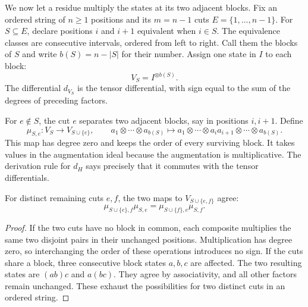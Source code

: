 We now let a residue multiply the states at its two adjacent blocks.
Fix an ordered string of $n\geq1$ positions and its $m=n-1$ cuts
$E=\{1,\ldots,n-1\}$.
For $S\subseteq E$, declare positions $i$ and $i+1$ equivalent when $i\in S$.
The equivalence classes are consecutive intervals, ordered from left to right.
Call them the blocks of $S$ and write $b(S)=n-|S|$ for their number.
Assign one state in $I$ to each block:
\begin{equation}
\label{eq:interval-coefficient-system}
V_S=I^{\otimes b(S)}.
\end{equation}
The differential $d_{V_S}$ is the tensor differential, with sign equal to the sum of the degrees of preceding factors.

For $e\notin S$, the cut $e$ separates two adjacent blocks, say in positions $i,i+1$.
Define
\[
\mu_{S,e}:V_S\longrightarrow V_{S\cup\{e\}},\qquad
 a_1\otimes\cdots\otimes a_{b(S)}
 \longmapsto
 a_1\otimes\cdots\otimes a_i a_{i+1}\otimes\cdots\otimes a_{b(S)}.
\]
This map has degree zero and keeps the order of every surviving block.
It takes values in the augmentation ideal because the augmentation is multiplicative.
The derivation rule for $d_H$ says precisely that it commutes with the tensor differentials.

\begin{lemma}
\label{lem:interval-coefficient-squares}
For distinct remaining cuts $e,f$, the two maps to $V_{S\cup\{e,f\}}$ agree:
\[
\mu_{S\cup\{e\},f}\mu_{S,e}
=\mu_{S\cup\{f\},e}\mu_{S,f}.
\]
\end{lemma}

\begin{proof}
If the two cuts have no block in common, each composite multiplies the same two disjoint pairs in their unchanged positions.
Multiplication has degree zero, so interchanging the order of these operations introduces no sign.
If the cuts share a block, three consecutive block states $a,b,c$ are affected.
The two resulting states are $(ab)c$ and $a(bc)$.
They agree by associativity, and all other factors remain unchanged.
These exhaust the possibilities for two distinct cuts in an ordered string.
\end{proof}

